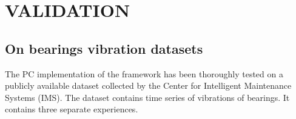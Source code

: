 \section{VALIDATION}
\label{sec:validation}

\subsection{On bearings vibration datasets}

The PC implementation of the framework has been thoroughly tested on a publicly available dataset collected by the Center for Intelligent Maintenance Systems (IMS).
The dataset contains time series of vibrations of bearings. It contains three separate  experiences. 

